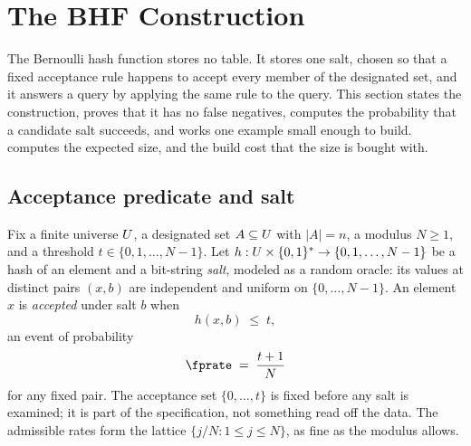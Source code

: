 %

\section{The BHF Construction}
\label{sec:bhf-construction}

The Bernoulli hash function stores no table. It stores one salt, chosen
so that a fixed acceptance rule happens to accept every member of the
designated set, and it answers a query by applying the same rule to the
query. This section states the construction, proves that it has no false
negatives, computes the probability that a candidate salt succeeds, and
works one example small enough to build. 
computes the expected size, and  the build
cost that the size is bought with.

\subsection*{Acceptance predicate and salt}

Fix a finite universe $U$, a designated set $A \subseteq
U$ with $|A| = n$, a modulus $N \ge 1$, and a threshold $t \in
\{0, 1, \ldots, N - 1\}$. Let $h : U \times \{0, 1\}^* \to \{0,
1, \ldots, N - 1\}$ be a hash of an element and a bit-string \emph{salt},
modeled as a random oracle: its values at distinct pairs $(x, b)$ are
independent and uniform on $\{0, \ldots, N - 1\}$. An element $x$ is
\emph{accepted} under salt $b$ when
\begin{equation}
\label{eq:bhf-accept}
  h(x, b) \;\le\; t,
\end{equation}
an event of probability
\[
  \fprate \;=\; \frac{t + 1}{N}
\]
for any fixed pair. The acceptance set $\{0, \ldots, t\}$ is fixed
before any salt is examined; it is part of the specification, not
something read off the data. The admissible rates form the lattice
$\{j / N : 1 \le j \le N\}$, as fine as the modulus allows.

